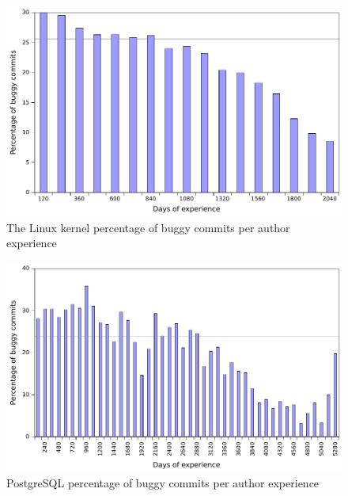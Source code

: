 
\begin{figure}
\begin{center}
\includegraphics[width=\columnwidth]{linux-bugginess-experience.pdf}
\end{center}
\caption{The Linux kernel percentage of buggy commits per author experience}
\label{fig-linux-bugginess-experience}
\end{figure}

\begin{figure}
\begin{center}
\includegraphics[width=\columnwidth]{postgresql-bugginess-experience.pdf}
\end{center}
\caption{PostgreSQL percentage of buggy commits per author experience}
\label{fig-postgresql-bugginess-experience}
\end{figure}


